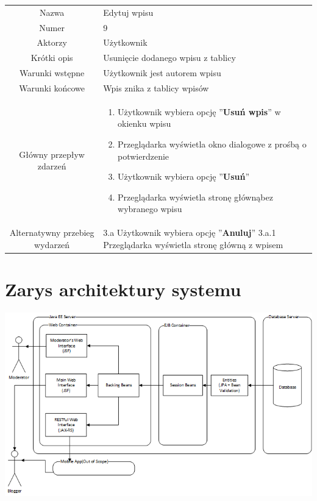 \documentclass[a4paper]{article}
\begin{document}
\begin{tabular}{c p{10cm}}
Nazwa& Edytuj wpisu\\
Numer	& 9\\
Aktorzy &	Użytkownik\\
Krótki opis & Usunięcie dodanego wpisu z tablicy\\
Warunki wstępne& Użytkownik jest autorem wpisu\\
Warunki końcowe& Wpis znika z tablicy wpisów\\
Główny przepływ zdarzeń&
\begin{enumerate}
\item Użytkownik wybiera opcję ''\textbf{Usuń wpis}'' w okienku wpisu
\item Przeglądarka wyświetla okno dialogowe z prośbą o potwierdzenie
\item Użytkownik wybiera opcję ''\textbf{Usuń}''
\item Przeglądarka wyświetla stronę głównąbez wybranego wpisu
\end{enumerate} \\

Alternatywny przebieg wydarzeń & 
3.a Użytkownik wybiera opcję ''\textbf{Anuluj}'' \newline 
3.a.1 Przeglądarka wyświetla stronę główną z wpisem
\\
\hline
\end{tabular}


\section{Zarys architektury systemu}
\includegraphics[width=\textwidth]{architecture}
\end{document}
